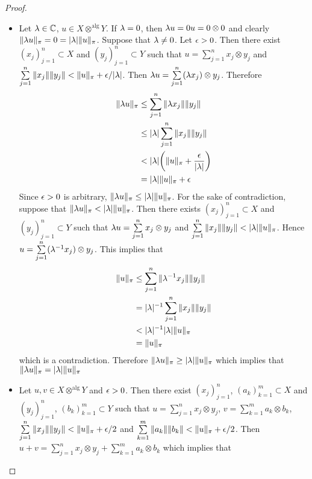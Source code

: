 \documentclass{book}
\begin{document}
	\begin{proof}\
	\begin{itemize}
	\item Let $\lambda \in \mathbb{C}$, $u \in X \otimes^{\text{alg}} Y$. If $\lambda = 0$, then $\lambda u = 0  u = 0 \otimes 0$ and clearly $\|\lambda u\|_{\pi} = 0 = |\lambda|\|u\|_{\pi}$. Suppose that $\lambda \neq 0$. Let $\epsilon >0$. Then there exist $(x_j)_{j=1}^n \subset X$ and $(y_j)_{j=1}^n \subset Y$ such that $u = \sum\limits_{j=1}^n x_j \otimes y_j $ and $\sum\limits_{j=1}^n \|x_j\| \|y_j\| < \|u\|_{\pi} + \epsilon/|\lambda| $. Then $\lambda u = \sum\limits_{j=1}^n (\lambda x_j) \otimes y_j $.
	Therefore
	\begin{align*}
	\|\lambda u\|_{\pi} 
	& \leq \sum\limits_{j=1}^n \|\lambda x_j\| \|y_j\| \\
	& \leq |\lambda| \sum\limits_{j=1}^n \| x_j\| \|y_j\| \\
	& < |\lambda| \bigg( \|u\|_{\pi} + \frac{\epsilon}{|\lambda|} \bigg) \\
	& = |\lambda| \|u\|_{\pi} + \epsilon
	\end{align*}
	Since $\epsilon >0$ is arbitrary, $\|\lambda u\|_{\pi} \leq |\lambda| \|u\|_{\pi} $. For the sake of contradiction, suppose that $\|\lambda u\|_{\pi} < |\lambda| \|u\|_{\pi} $. Then there exists $(x_j)_{j=1}^n \subset X$ and $(y_j)_{j=1}^n \subset Y$ such that $\lambda u = \sum\limits_{j=1}^n x_j \otimes y_j $ and $\sum\limits_{j=1}^n \|x_j\| \|y_j\| < |\lambda| \|u\|_{\pi}$. Hence $u = \sum\limits_{j=1}^n (\lambda^{-1}x_j) \otimes y_j$. This implies that 
	\begin{align*}
	\|u \|_{\pi} 
	& \leq \sum\limits_{j=1}^n \|\lambda^{-1}x_j\| \|y_j\| \\
	&= |\lambda |^{-1}\sum\limits_{j=1}^n \|x_j\| \|y_j\| \\
	&< |\lambda |^{-1} |\lambda| \|u\|_{\pi} \\
	&= \|u\|_{\pi}
	\end{align*}
	which is a contradiction. Therefore $\|\lambda u\|_{\pi} \geq |\lambda| \|u\|_{\pi}$ which implies that $\|\lambda u\|_{\pi} = |\lambda| \|u\|_{\pi}$
	\item Let $u, v \in X \otimes^{\text{alg}} Y$ and $\epsilon >0$. Then there exist $(x_j)_{j=1}^n$, $(a_k)_{k=1}^m \subset X$ and $(y_j)_{j=1}^n$, $(b_k)_{k=1}^m \subset Y$ such that $u = \sum\limits_{j=1}^n x_j \otimes y_j $, $v = \sum\limits_{k=1}^m a_k \otimes b_k $, $\sum\limits_{j=1}^n \|x_j\| \|y_j\| < \|u\|_{\pi} + \epsilon/2$ and $\sum\limits_{k=1}^m \|a_k\| \|b_k\| < \|u\|_{\pi} + \epsilon/2$. Then $u+v = \sum\limits_{j=1}^n x_j \otimes y_j + \sum\limits_{k=1}^m a_k \otimes b_k $ which implies that 

\end{itemize}
\end{proof}
\end{document}
